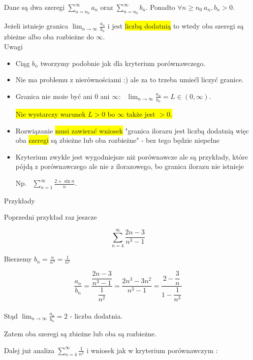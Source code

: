 Dane są dwa szeregi $ \sum\limits_{n = n_0}^{\infty} a_n $ oraz $ \sum\limits_{n = n_0}^{\infty} b_n $.
Ponadto $ \forall n \geq n_0 \ a_n, b_n > 0 $.

Jeżeli istnieje granica $ \lim_{n \to \infty} \frac{a_n}{b_n} $ i jest \colorbox{yellow}{liczbą dodatnią} to wtedy oba
szeregi są zbieżne albo oba rozbieżne do $\infty$. \\

Uwagi

\begin{itemize}
    \item Ciąg $b_n$ tworzymy podobnie jak dla kryterium porównawczego.
    \item Nie ma problemu z nierównościami :) ale za to trzeba umiećl liczyć granice.
    \item Granica nie może być ani 0 ani $\infty$: \ $ \lim_{n \to \infty} \frac{a_n}{b_n} = L \in (0, \infty) $.
    
    \colorbox{yellow}{Nie wystarczy warunek $L > 0$ bo $\infty$ także jest $ > 0$.}
    \item Rozwiązanie \colorbox{yellow}{musi zawierać wniosek} "granica ilorazu jest liczbą dodatnią więc oba
    \colorbox{yellow}{szeregi} są zbieżne lub oba rozbieżne" - bez tego będzie niepełne
    
    \item Kryterium zwykle jest wygodniejsze niż porównawcze ale są przykłady, które pójdą z porównawczego ale nie z
    ilorazowego, bo granica ilorazu nie istnieje
    
    Np. \ $ \sum\limits_{n = 1}^{\infty} \frac{2 + \sin n}{n} $.
\end{itemize}

Przykłady

Poprzedni przykład raz jeszcze 

$$ \sum\limits_{n = 4}^{\infty} \frac{2n - 3}{n^3 - 1} $$

Bierzemy $ b_n = \frac{n}{n^3} = \frac{1}{n^2} $

$$ \dfrac{a_n}{b_n} = \dfrac{\dfrac{2n - 3}{n^3 - 1}}{\dfrac{1}{n^2}} = \dfrac{2n^3 - 3n^2}{n^3 - 1}
= \dfrac{2 - \dfrac{3}{n}}{1 - \dfrac{1}{n^3}} $$ \\

Stąd $ \lim_{n \to \infty} \frac{a_n}{b_n} = 2 $ - liczba dodatnia.

Zatem oba szeregi są zbieżne lub oba są rozbieżne.

Dalej już analiza $ \sum\limits_{n = 4}^{\infty} \frac{1}{n^2} $ i wniosek jak w kryterium porównawczym :

